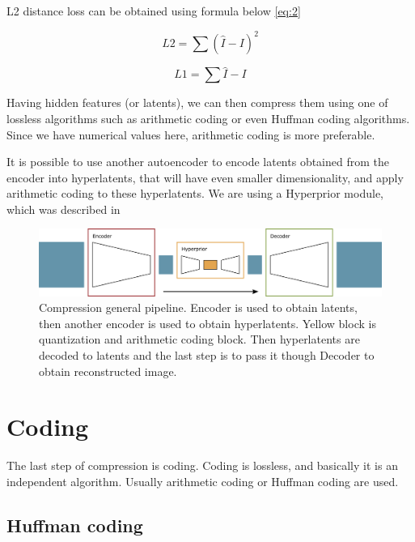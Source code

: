 L2 distance loss can be obtained using formula below \ref{eq:2}

\begin{equation}
    \label{eq:2}
    L2=\sum (\hat{I}-I)^2
\end{equation}

\begin{equation}
    \label{eq:1}
    L1=\sum \hat{I}-I
\end{equation}

Having hidden features (or latents), we can then compress them using one of lossless algorithms such as arithmetic coding or even Huffman coding algorithms. Since we have numerical values here, arithmetic coding is more preferable.

It is possible to use another autoencoder to encode latents obtained from the encoder into hyperlatents, that will have even smaller dimensionality, and apply arithmetic coding to these hyperlatents. We are using a Hyperprior module, which was described in \cite{balle_variational_2018}

\begin{figure}[!ht]
    \centering
    \includegraphics[width=\textwidth]{figure/general.png}
    \caption{Compression general pipeline. Encoder is used to obtain latents, then another encoder is used to obtain hyperlatents. Yellow block is quantization and arithmetic coding block. Then hyperlatents are decoded to latents and the last step is to pass it though Decoder to obtain reconstructed image.}
    \label{whole-system-geneal-pipeline}
\end{figure}

\section{Coding}

The last step of compression is coding. Coding is lossless, and basically it is an independent algorithm. Usually arithmetic coding or Huffman coding are used.

\subsection{Huffman coding}

